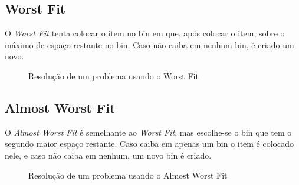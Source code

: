 \subsection{Worst Fit}

O \textit{Worst Fit} tenta colocar o item no bin em que, após colocar o item, sobre o máximo de espaço restante
no bin. Caso não caiba em nenhum bin, é criado um novo.

\begin{figure}[H]
  \centering
  \caption{Resolução de um problema usando o Worst Fit}
\end{figure}

\subsection{Almost Worst Fit}

O \textit{Almost Worst Fit} é semelhante ao \textit{Worst Fit}, mas escolhe-se o bin que tem o segundo maior
espaço restante. Caso caiba em apenas um bin o item é colocado nele, e caso não caiba em nenhum, um novo bin
é criado.

\begin{figure}[H]
  \centering
  \caption{Resolução de um problema usando o Almost Worst Fit}
\end{figure}

